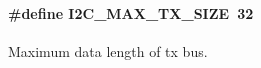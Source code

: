 \paragraph[{\texorpdfstring{I2\+C\+\_\+\+M\+A\+X\+\_\+\+T\+X\+\_\+\+S\+I\+ZE}{I2C_MAX_TX_SIZE}}]{\setlength{\rightskip}{0pt plus 5cm}\#define I2\+C\+\_\+\+M\+A\+X\+\_\+\+T\+X\+\_\+\+S\+I\+ZE~32}\hypertarget{group___i2_c___m_a_x___s_i_z_e___d_e_f_ga7f177b43ed9acb3a242d59bb0634d472}{}\label{group___i2_c___m_a_x___s_i_z_e___d_e_f_ga7f177b43ed9acb3a242d59bb0634d472}
Maximum data length of tx bus. 